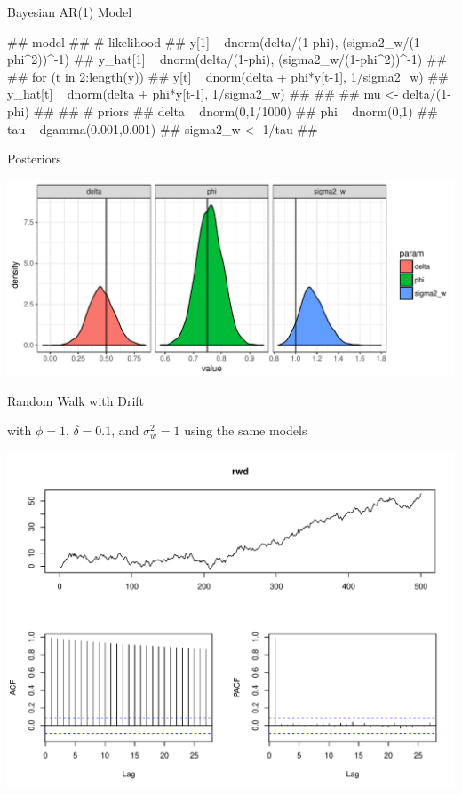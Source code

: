 \documentclass[11pt,ignorenonframetext,]{beamer}
\let\oldverbatim\verbatim
\let\endoldverbatim\endverbatim
\renewenvironment{verbatim}{\footnotesize\begin{spacing}{0.9}\oldverbatim}{\endoldverbatim\end{spacing}}
\begin{document}
\begin{frame}[fragile,t]{Bayesian AR(1) Model}

\begin{verbatim}
## model{
## # likelihood
##   y[1] ~ dnorm(delta/(1-phi), (sigma2_w/(1-phi^2))^-1)
##   y_hat[1] ~ dnorm(delta/(1-phi), (sigma2_w/(1-phi^2))^-1)
## 
##   for (t in 2:length(y)) {
##     y[t] ~ dnorm(delta + phi*y[t-1], 1/sigma2_w)
##     y_hat[t] ~ dnorm(delta + phi*y[t-1], 1/sigma2_w)
##   }
##   
##   mu <- delta/(1-phi)
## 
## # priors
##   delta ~ dnorm(0,1/1000)
##   phi ~ dnorm(0,1)
##   tau ~ dgamma(0.001,0.001)
##   sigma2_w <- 1/tau
## }
\end{verbatim}

\end{frame}

\begin{frame}{Posteriors}

\begin{center}\includegraphics{Lec10_files/figure-beamer/unnamed-chunk-6-1} \end{center}

\end{frame}

\begin{frame}{Random Walk with Drift}

with \(\phi = 1\), \(\delta=0.1\), and \(\sigma_w^2=1\) using the same
models

\includegraphics{Lec10_files/figure-beamer/unnamed-chunk-7-1.pdf}

\end{frame}
\end{document}
